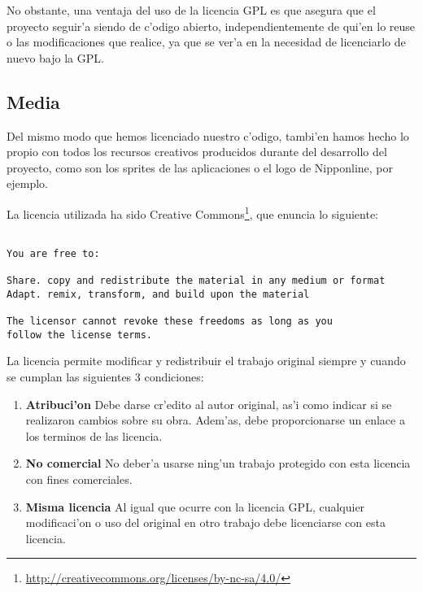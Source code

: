 No obstante, una ventaja del uso de la licencia GPL es que asegura que el proyecto seguir'a siendo de c'odigo abierto, 
independientemente de qui'en lo reuse o las modificaciones que realice, ya que se ver'a en la necesidad de licenciarlo 
de nuevo bajo la GPL.

\subsection{Media}
\label{sub:licencia_media}

Del mismo modo que hemos licenciado nuestro c'odigo, tambi'en hamos hecho lo propio con todos los recursos creativos 
producidos durante del desarrollo del proyecto, como son los sprites de las aplicaciones o el logo de Nipponline, 
por ejemplo.

La licencia utilizada ha sido Creative Commons\footnote{\url{http://creativecommons.org/licenses/by-nc-sa/4.0/}}, que 
enuncia lo siguiente:

\begin{verbatim}

You are free to:

Share. copy and redistribute the material in any medium or format
Adapt. remix, transform, and build upon the material

The licensor cannot revoke these freedoms as long as you
follow the license terms.

\end{verbatim}

La licencia permite modificar y redistribuir el trabajo original siempre y cuando se cumplan las siguientes 3 
condiciones:

\begin{enumerate}
\item \textbf{Atribuci'on} Debe darse cr'edito al autor original, as'i como indicar si se realizaron cambios sobre su 
obra. Adem'as, debe proporcionarse un enlace a los terminos de las licencia.
\item \textbf{No comercial} No deber'a usarse ning'un trabajo protegido con esta licencia con fines comerciales.
\item \textbf{Misma licencia} Al igual que ocurre con la licencia GPL, cualquier modificaci'on o uso del original en 
otro trabajo debe licenciarse con esta licencia.
\end{enumerate}


